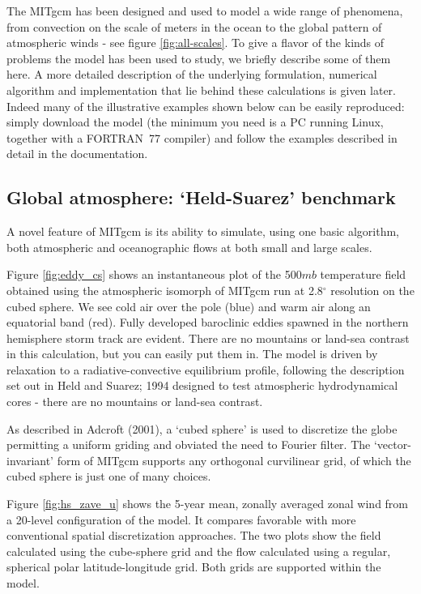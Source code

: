 The MITgcm has been designed and used to model a wide range of phenomena,
from convection on the scale of meters in the ocean to the global pattern of
atmospheric winds - see figure \ref{fig:all-scales}. To give a flavor of the
kinds of problems the model has been used to study, we briefly describe some
of them here. A more detailed description of the underlying formulation,
numerical algorithm and implementation that lie behind these calculations is
given later. Indeed many of the illustrative examples shown below can be
easily reproduced: simply download the model (the minimum you need is a PC
running Linux, together with a FORTRAN\ 77 compiler) and follow the examples
described in detail in the documentation.

\subsection{Global atmosphere: `Held-Suarez' benchmark}

A novel feature of MITgcm is its ability to simulate, using one basic algorithm, 
both atmospheric and oceanographic flows at both small and large scales.

Figure \ref{fig:eddy_cs} shows an instantaneous plot of the 500$mb$
temperature field obtained using the atmospheric isomorph of MITgcm run at
2.8$^{\circ }$ resolution on the cubed sphere. We see cold air over the pole
(blue) and warm air along an equatorial band (red). Fully developed
baroclinic eddies spawned in the northern hemisphere storm track are
evident. There are no mountains or land-sea contrast in this calculation,
but you can easily put them in. The model is driven by relaxation to a
radiative-convective equilibrium profile, following the description set out
in Held and Suarez; 1994 designed to test atmospheric hydrodynamical cores -
there are no mountains or land-sea contrast.



As described in Adcroft (2001), a `cubed sphere' is used to discretize the
globe permitting a uniform griding and obviated the need to Fourier filter.
The `vector-invariant' form of MITgcm supports any orthogonal curvilinear
grid, of which the cubed sphere is just one of many choices.

Figure \ref{fig:hs_zave_u} shows the 5-year mean, zonally averaged zonal
wind from a 20-level configuration of
the model. It compares favorable with more conventional spatial
discretization approaches. The two plots show the field calculated using the
cube-sphere grid and the flow calculated using a regular, spherical polar
latitude-longitude grid. Both grids are supported within the model.

